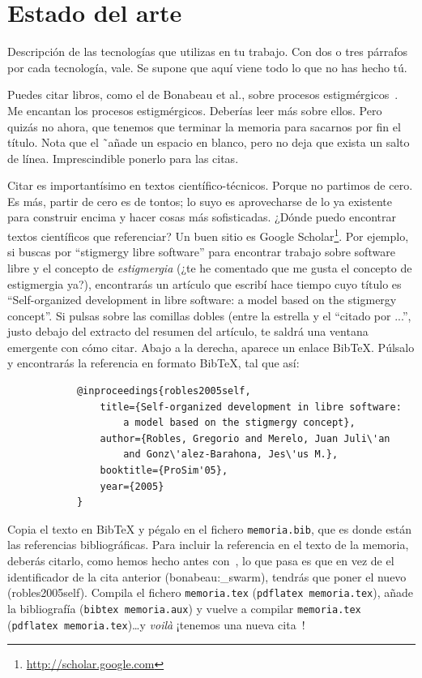 \documentclass[a4paper, 12pt]{book}
\begin{document}
	\cleardoublepage
	\chapter{Estado del arte}
	\label{chap:estado}
	
	Descripción de las tecnologías que utilizas en tu trabajo. 
	Con dos o tres párrafos por cada tecnología, vale. 
	Se supone que aquí viene todo lo que no has hecho tú.
	
	Puedes citar libros, como el de Bonabeau et al., sobre procesos estigmérgicos~\cite{bonabeau:_swarm}. 
	Me encantan los procesos estigmérgicos.
	Deberías leer más sobre ellos.
	Pero quizás no ahora, que tenemos que terminar la memoria para sacarnos por fin el título.
	Nota que el \~ \ añade un espacio en blanco, pero no deja que exista un salto de línea. 
	Imprescindible ponerlo para las citas.
	
	Citar es importantísimo en textos científico-técnicos. 
	Porque no partimos de cero.
	Es más, partir de cero es de tontos; lo suyo es aprovecharse de lo ya existente para construir encima y hacer cosas más sofisticadas.
	¿Dónde puedo encontrar textos científicos que referenciar?
	Un buen sitio es Google Scholar\footnote{\url{http://scholar.google.com}}.
	Por ejemplo, si buscas por ``stigmergy libre software'' para encontrar trabajo sobre software libre y el concepto de \emph{estigmergia} (¿te he comentado que me gusta el concepto de estigmergia ya?), encontrarás un artículo que escribí hace tiempo cuyo título es ``Self-organized development in libre software: a model based on the stigmergy concept''.
	Si pulsas sobre las comillas dobles (entre la estrella y el ``citado por ...'', justo debajo del extracto del resumen del artículo, te saldrá una ventana emergente con cómo citar.
	Abajo a la derecha, aparece un enlace BibTeX.
	Púlsalo y encontrarás la referencia en formato BibTeX, tal que así:
	
	{\footnotesize
		\begin{verbatim}
			@inproceedings{robles2005self,
				title={Self-organized development in libre software:
					a model based on the stigmergy concept},
				author={Robles, Gregorio and Merelo, Juan Juli\'an 
					and Gonz\'alez-Barahona, Jes\'us M.},
				booktitle={ProSim'05},
				year={2005}
			}
		\end{verbatim}
	}
	
	Copia el texto en BibTeX y pégalo en el fichero \texttt{memoria.bib}, que es donde están las referencias bibliográficas.
	Para incluir la referencia en el texto de la memoria, deberás citarlo, como hemos hecho antes con~\cite{bonabeau:_swarm}, lo que pasa es que en vez de el identificador de la cita anterior (bonabeau:\_swarm), tendrás que poner el nuevo (robles2005self).
	Compila el fichero \texttt{memoria.tex} (\texttt{pdflatex memoria.tex}), añade la bibliografía (\texttt{bibtex memoria.aux}) y vuelve a compilar \texttt{memoria.tex} (\texttt{pdflatex memoria.tex})\ldots y \emph{voilà} ¡tenemos una nueva cita~\cite{robles2005self}!
	
\end{document}

